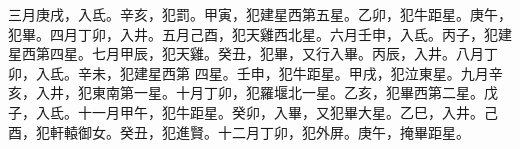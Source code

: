 \begin{pinyinscope}
 三月庚戌，入氐。辛亥，犯罰。甲寅，犯建星西第五星。乙卯，犯牛距星。庚午，犯畢。四月丁卯，入井。五月己酉，犯天雞西北星。六月壬申，入氐。丙子，犯建星西第四星。七月甲辰，犯天雞。癸丑，犯畢，又行入畢。丙辰，入井。八月丁卯，入氐。辛未，犯建星西第
 四星。壬申，犯牛距星。甲戌，犯泣東星。九月辛亥，入井，犯東南第一星。十月丁卯，犯羅堰北一星。乙亥，犯畢西第二星。戊子，入氐。十一月甲午，犯牛距星。癸卯，入畢，又犯畢大星。乙巳，入井。己酉，犯軒轅御女。癸丑，犯進賢。十二月丁卯，犯外屏。庚午，掩畢距星。



\end{pinyinscope}